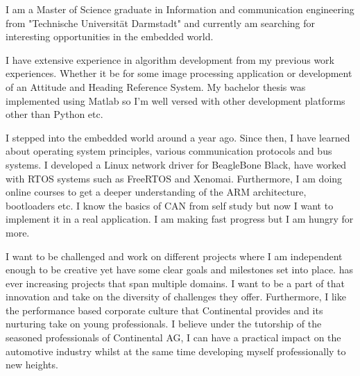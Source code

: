 \documentclass[11pt, a4paper]{awesome-cv}
\begin{document}

\makecvheader
\vspace{-8mm}
\makelettertitle

\begin{cvletter}

I am a Master of Science graduate in Information and communication engineering from "Technische Universität Darmstadt" and currently am searching for interesting opportunities in the embedded world.

I have extensive experience in algorithm development from my previous work experiences. Whether it be for some image processing application or development of an Attitude and Heading Reference System. My bachelor thesis was implemented using Matlab so I'm well versed with other development platforms other than Python etc. 

I stepped into the embedded world around a year ago. Since then, I have learned about operating system principles, various communication protocols and bus systems. I developed a Linux network driver for BeagleBone Black, have worked with RTOS systems such as FreeRTOS and Xenomai. Furthermore, I am doing online courses to get a deeper understanding of the ARM architecture, bootloaders etc. I know the basics of CAN from self study but now I want to implement it in a real application. I am making fast progress but I am hungry for more.


I want to be challenged and work on different projects where I am independent enough to be creative yet have some clear goals and milestones set into place. \getrecipientname\space has ever increasing projects that span multiple domains. I want to be a part of that innovation and take on the diversity of challenges they offer. Furthermore, I like the performance based corporate culture that Continental provides and its nurturing take on young professionals. I believe under the tutorship of the seasoned professionals of Continental AG, I can have a practical impact on the automotive industry whilst at the same time developing myself professionally to new heights.



\end{cvletter}
\end{document}
